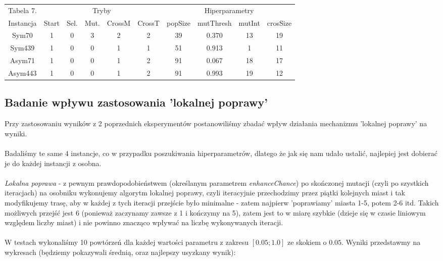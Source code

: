 \documentclass{article}
\begin{document}
\begin{table}[h!]
	\centering
	\begin{tabular}{c||c|c|c|c|c||c|c|c|c}
Tabela 7. & \multicolumn{5}{c}{Tryby} &\multicolumn{4}{c}{Hiperparametry}\\
Instancja & Start & Sel. & Mut. & CrossM & CrossT & popSize & mutThresh & mutInt & crosSize \\
\hline
Sym70 & 1 & 0 & 3 & 2 & 2 & 39 & 0.370 & 13 & 19\\
Sym439 & 1 & 0 & 0 & 1 & 1 & 51 & 0.913 & 1 & 11\\
Asym71 & 1 & 0 & 0 & 1 & 2 & 91 & 0.067 & 18 & 17\\
Asym443 & 1 & 0 & 0 & 1 & 2 & 91 & 0.993 & 19 & 12\\

	\end{tabular}
\end{table}

\subsection{Badanie wpływu zastosowania 'lokalnej poprawy'}
Przy zastosowaniu wyników z 2 poprzednich eksperymentów postanowiliśmy zbadać wpływ działania mechanizmu 'lokalnej poprawy' na wyniki.\\\\
Badaliśmy te same 4 instancje, co w przypadku poszukiwania hiperparametrów, dlatego że jak się nam udało ustalić, najlepiej jest dobierać je do każdej instancji z osobna.\\\\
\textit{Lokalna poprawa} - z pewnym prawdopodobieństwem (określanym parametrem \textit{enhanceChance}) po skończonej mutacji (czyli po szystkich iteracjach) na osobniku wykonujemy algorytm lokalnej poprawy, czyli iteracyjnie przechodzimy przez piątki kolejnych miast i tak modyfikujemy trasę, aby w każdej z tych iteracji przejście było minimalne - zatem najpierw 'poprawiamy' miasta 1-5, potem 2-6 itd. Takich możliwych przejść jest 6 (ponieważ zaczynamy zawsze z 1 i kończymy na 5), zatem jest to w miarę szybkie (dzieje się w czasie liniowym względem liczby miast) i nie powinno znacząco wpływać na liczbę wykonywanych iteracji.\\\\
W testach wykonaliśmy 10 powtórzeń dla każdej wartości parametru z zakresu $[0.05 ; 1.0]$ ze skokiem o $0.05$. Wyniki przedstawmy na wykresach (będziemy pokazywali średnią, oraz najlepszy usyzkany wynik):
\end{document}

